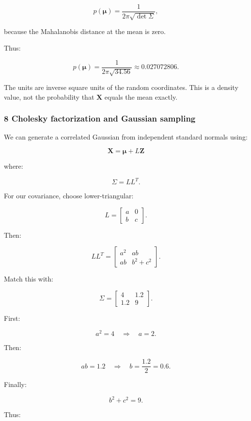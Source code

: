\[
 p(\boldsymbol\mu)= \frac1{2\pi\sqrt{\det\Sigma}},
\]

because the Mahalanobis distance at the mean is zero.

Thus:

\[
 \boxed{ p(\boldsymbol\mu) = \frac1{2\pi\sqrt{34.56}} \approx0.027072806 }.
\]

The units are inverse square units of the random coordinates. This is a density value, not the probability that \(\mathbf X\) equals the mean exactly.

\subsubsection{8 Cholesky factorization and Gaussian sampling}\label{02-foundations-ii-ch024-cholesky-factorization-and-gaussian-sampling}

\hypertarget{02-foundations-ii-ch024-cholesky-factorization-and-gaussian-sampling}{}

We can generate a correlated Gaussian from independent standard normals using:

\[
 \mathbf X=\boldsymbol\mu+L\mathbf Z
\]

where:

\[
 \Sigma=LL^T.
\]

For our covariance, choose lower-triangular:

\[
 L= \begin{bmatrix} a&0\\ b&c \end{bmatrix}.
\]

Then:

\[
 LL^T= \begin{bmatrix} a^2&ab\\ ab&b^2+c^2 \end{bmatrix}.
\]

Match this with:

\[
 \Sigma= \begin{bmatrix} 4&1.2\\ 1.2&9 \end{bmatrix}.
\]

First:

\[
 a^2=4 \quad\Longrightarrow\quad a=2.
\]

Then:

\[
 ab=1.2 \quad\Longrightarrow\quad b=\frac{1.2}{2}=0.6.
\]

Finally:

\[
 b^2+c^2=9.
\]

Thus:

